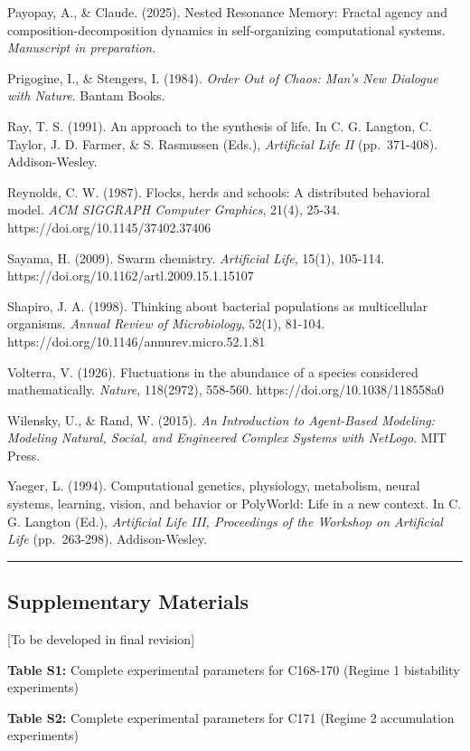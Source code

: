 \documentclass[
]{article}
\begin{document}
Payopay, A., \& Claude. (2025). Nested Resonance Memory: Fractal agency
and composition-decomposition dynamics in self-organizing computational
systems. \emph{Manuscript in preparation}.

Prigogine, I., \& Stengers, I. (1984). \emph{Order Out of Chaos: Man's
New Dialogue with Nature}. Bantam Books.

Ray, T. S. (1991). An approach to the synthesis of life. In C. G.
Langton, C. Taylor, J. D. Farmer, \& S. Rasmussen (Eds.),
\emph{Artificial Life II} (pp.~371-408). Addison-Wesley.

Reynolds, C. W. (1987). Flocks, herds and schools: A distributed
behavioral model. \emph{ACM SIGGRAPH Computer Graphics}, 21(4), 25-34.
https://doi.org/10.1145/37402.37406

Sayama, H. (2009). Swarm chemistry. \emph{Artificial Life}, 15(1),
105-114. https://doi.org/10.1162/artl.2009.15.1.15107

Shapiro, J. A. (1998). Thinking about bacterial populations as
multicellular organisms. \emph{Annual Review of Microbiology}, 52(1),
81-104. https://doi.org/10.1146/annurev.micro.52.1.81

Volterra, V. (1926). Fluctuations in the abundance of a species
considered mathematically. \emph{Nature}, 118(2972), 558-560.
https://doi.org/10.1038/118558a0

Wilensky, U., \& Rand, W. (2015). \emph{An Introduction to Agent-Based
Modeling: Modeling Natural, Social, and Engineered Complex Systems with
NetLogo}. MIT Press.

Yaeger, L. (1994). Computational genetics, physiology, metabolism,
neural systems, learning, vision, and behavior or PolyWorld: Life in a
new context. In C. G. Langton (Ed.), \emph{Artificial Life III,
Proceedings of the Workshop on Artificial Life} (pp.~263-298).
Addison-Wesley.

\begin{center}\rule{0.5\linewidth}{0.5pt}\end{center}

\subsection{Supplementary Materials}\label{supplementary-materials}

{[}To be developed in final revision{]}

\textbf{Table S1:} Complete experimental parameters for C168-170 (Regime
1 bistability experiments)

\textbf{Table S2:} Complete experimental parameters for C171 (Regime 2
accumulation experiments)
\end{document}
